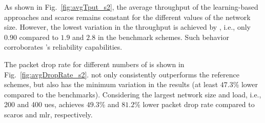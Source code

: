 As shown in Fig.~\ref{fig:avgTput_s2}, the average throughput of the learning-based approaches \name{} and \gls{scaros} remains constant for the different values of the network size. However, the lowest variation in the  throughput is achieved by \name{}, i.e., only $0.90$ compared to $1.9$ and $2.8$ in the benchmark schemes. Such behavior corroborates \name{}'s reliability capabilities. 

The packet drop rate for different numbers of \nodes{} is shown in Fig.~\ref{fig:avgDropRate_s2}. \name{} not only consistently outperforms the reference schemes, but also has the minimum variation in the results (at least $47.3$\% lower compared to the benchmarks). Considering the largest network size and load, i.e., 200 \nodes{} and 400 \glspl{ue}, \name{} achieves $49.3$\% and $81.2$\% lower packet drop rate compared to \gls{scaros} and \gls{mlr}, respectively. 




